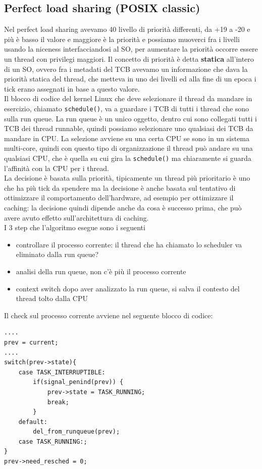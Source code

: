 \documentclass[12pt, oneside]{extbook}
\begin{document}
\subsection{Perfect load sharing (POSIX classic)}
Nel perfect load sharing avevamo 40 livello di priorità differenti, da +19 a -20 e più è basso il valore e maggiore è la priorità e possiamo muoverci fra i livelli usando la niceness interfacciandosi al SO, per aumentare la priorità occorre essere un thread con privilegi maggiori. Il concetto di priorità è detta \textbf{statica} all'intero di un SO, ovvero fra i metadati del TCB avevamo un informazione che dava la priorità statica del thread, che metteva in uno dei livelli ed alla fine di un epoca i tick erano assegnati in base a questo valore.\\Il blocco di codice del kernel Linux che deve selezionare il thread da mandare in esercizio, chiamato \texttt{schedule()}, va a guardare i TCB di tutti i thread che sono sulla run queue. La run queue è un unico oggetto, dentro cui sono collegati tutti i TCB dei thread runnable, quindi possiamo selezionare uno qualsiasi dei TCB da mandare in CPU. La selezione avviene su una certa CPU se sono in un sistema multi-core, quindi con questo tipo di organizzazione il thread può andare su una qualsiasi CPU, che è quella su cui gira la \texttt{schedule()} ma chiaramente si guarda l'affinità con la CPU per i thread.\\La decisione è basata sulla priorità, tipicamente un thread più prioritario è uno che ha più tick da spendere ma la decisione è anche basata sul tentativo di ottimizzare il comportamento dell'hardware, ad esempio per ottimizzare il caching: la decisione quindi dipende anche da cosa è successo prima, che può avere avuto effetto sull'architettura di caching.\\I 3 step che l'algoritmo esegue sono i seguenti
\begin{itemize}
\item controllare il processo corrente: il thread che ha chiamato lo scheduler va eliminato dalla run queue?
\item analisi della run queue, non c'è più il processo corrente
\item context switch dopo aver analizzato la run queue, si salva il contesto del thread tolto dalla CPU
\end{itemize}
Il check sul processo corrente avviene nel seguente blocco di codice:
\begin{lstlisting}
....
prev = current;
....
switch(prev->state){
	case TASK_INTERRUPTIBLE:
		if(signal_penind(prev)) {
			prev->state = TASK_RUNNING;
			break;
		}
	default:
		del_from_runqueue(prev);
	case TASK_RUNNING:;
}
prev->need_resched = 0;
\end{lstlisting}
\end{document}
